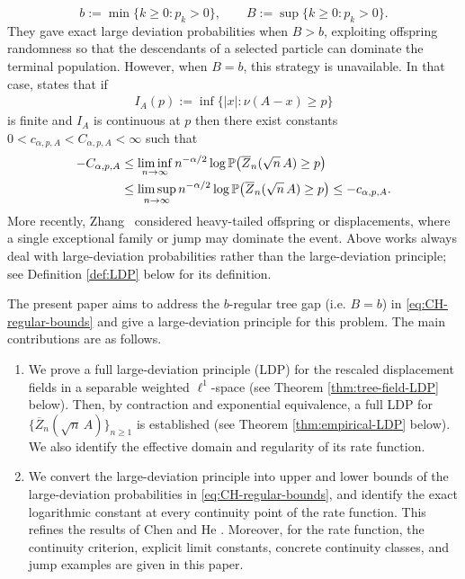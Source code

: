 \documentclass[a4paper, 11pt]{article}
\newcommand{\1}{\mathbf 1}
\theoremstyle{plain}
\begin{document}
\[
  b:=\min\{k\geq0:p_k>0\},
  \qquad
  B:=\sup\{k\geq0:p_k>0\}.
\]
They \cite[Theorem~1.3]{ChenHe2019} gave exact large deviation probabilities when \(B>b\), exploiting
offspring randomness so that the descendants of a selected particle can
dominate the terminal population.  However, when \(B=b\), this strategy is unavailable. In that case, \cite[Theorem~1.3(3)]{ChenHe2019} states that if
\begin{align}\label{4he6hyh62}
I_A(p):=\inf\{|x|:\nu(A-x)\geq p\}
\end{align}
is finite and $I_A$ is continuous at $p$ then there exist constants
\(0<c_{\alpha,p,A}<C_{\alpha,p,A}<\infty\) such that
\begin{align}
  -C_{\alpha,p,A}
  &\leq
  \liminf_{n\to\infty}n^{-\alpha/2}
  \log\mathbb{P}\!\left(\overline Z_n(\sqrt n\,A)\geq p\right)
  \notag\\
  &\leq
  \limsup_{n\to\infty}n^{-\alpha/2}
  \log\mathbb{P}\!\left(\overline Z_n(\sqrt n\,A)\geq p\right)
  \leq-c_{\alpha,p,A}.
  \label{eq:CH-regular-bounds}
\end{align}
More recently, Zhang~\cite{Zhang2022} considered
heavy-tailed offspring or displacements, where a single exceptional family
or jump may dominate the event. Above works \cite{ChenHe2019,LouidorPerkins2015,LouidorTsairi2017,Zhang2022} always deal with large-deviation probabilities rather than the large-deviation principle; see Definition \ref{def:LDP} below for its definition.
\par

The present paper aims to address the $b$-regular tree gap (i.e. $B=b$) in \eqref{eq:CH-regular-bounds} and give a large-deviation principle for this problem. The main contributions are as follows.
\begin{enumerate}
  \item We prove a full large-deviation principle (LDP) for the rescaled displacement fields in a
  separable weighted \(\ell^1\)-space (see Theorem \ref{thm:tree-field-LDP} below). Then, by contraction and exponential
  equivalence, a full LDP for \(\{\overline Z_n(\sqrt n\,A)\}_{n\geq1}\) is established (see Theorem \ref{thm:empirical-LDP} below). We also identify the effective domain and regularity of its rate function.
  \item We convert the large-deviation principle into upper and lower
  bounds of the large-deviation probabilities in \eqref{eq:CH-regular-bounds}, and identify the exact logarithmic constant at every continuity point of the rate function. This refines the results of Chen and He \cite[Theorem 1.3(3)]{ChenHe2019}. Moreover, for the rate function, the continuity criterion, explicit limit constants, concrete continuity classes, and jump examples are given in this paper.
\end{enumerate}
\end{document}
